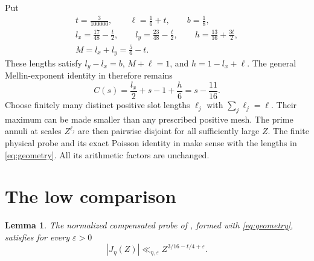 \documentclass[11pt]{article}
\newtheorem{lemma}[theorem]{Lemma}
\begin{document}
Put
\begin{equation}\label{eq:geometry}
\begin{gathered}
 t=\frac3{100000},\qquad
 \ell=\frac16+t,\qquad b=\frac18,\\
 l_x=\frac{17}{48}-\frac t2,\qquad
 l_y=\frac{23}{48}-\frac t2,\qquad
 h=\frac{13}{16}+\frac{3t}{2},\\
 M=l_x+l_y=\frac56-t.
\end{gathered}
\end{equation}
These lengths satisfy $l_y-l_x=b$, $M+\ell=1$, and
$h=1-l_x+\ell$. The general Mellin-exponent identity in
\cite[Part II, compensated low estimate]{OAI} therefore remains
\begin{equation}\label{eq:signal}
 C(s)=\frac{l_x}{2}+s-1+\frac h6=s-\frac{11}{16}.
\end{equation}
Choose finitely many distinct positive slot lengths $\ell_j$ with
$\sum_j\ell_j=\ell$. Their maximum can be made smaller than any prescribed
positive mesh. The prime annuli at scales $Z^{\ell_j}$ are then pairwise
disjoint for all sufficiently large $Z$. The finite physical
probe and its exact Poisson identity in \cite{OAI} make sense with the
lengths in \eqref{eq:geometry}. All its arithmetic factors are unchanged.

\section{The low comparison}\label{sec:low}

\begin{lemma}\label{lem:low}
The normalized compensated probe of \cite{OAI}, formed with
\eqref{eq:geometry}, satisfies for every $\varepsilon>0$
\[
       |J_\eta(Z)|\ll_{\eta,\varepsilon}
             Z^{3/16-t/4+\varepsilon}.
\]
\end{lemma}
\end{document}
